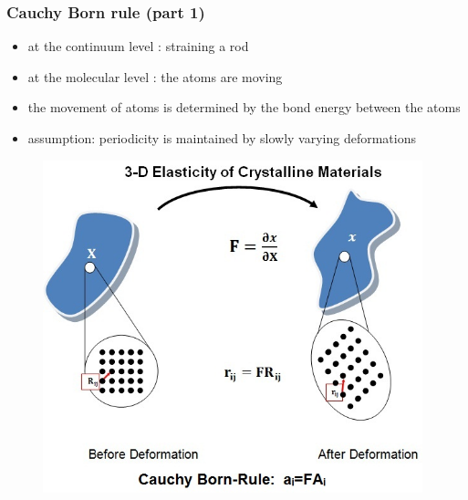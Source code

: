 \begin{frame}
  \frametitle{Cauchy Born rule (part 1)}
  
  \begin{itemize}
    \item at the continuum level : straining a rod
    \item at the molecular level : the atoms are moving
    \item the movement of atoms is determined by the bond energy between the atoms
    \item assumption: periodicity is maintained by slowly varying deformations
  \end{itemize}
  
  \begin{figure}
    \centering
    \includegraphics[width=11cm, keepaspectratio=true]{sections/cosserat_rods/images/DeformedCrystalLatticePrakhar}
  \end{figure}

\end{frame}


